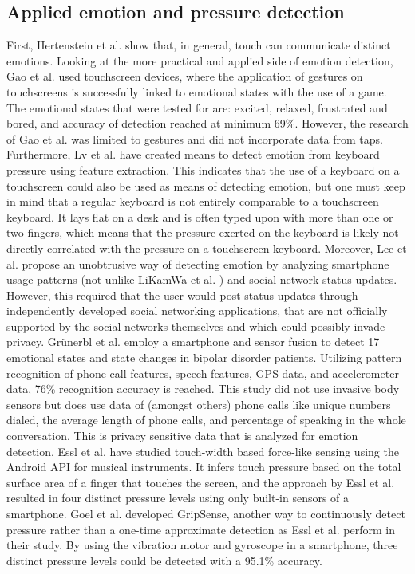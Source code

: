 \documentclass{sigchi}
\begin{document}
\subsection{Applied emotion and pressure detection} %
\label{sub:practical_applications}
First, Hertenstein et al. \cite{Hertenstein2006} show that, in general, touch can communicate distinct emotions. Looking at the more practical and applied side of emotion detection, Gao et al. \cite{Gao2012} used touchscreen devices, where the application of gestures on touchscreens is successfully linked to emotional states with the use of a game. The emotional states that were tested for are: excited, relaxed, frustrated and bored, and accuracy of detection reached at minimum 69\%. However, the research of Gao et al. was limited to gestures and did not incorporate data from taps. Furthermore, Lv et al. \cite{H.R.LvZ.L.LinW.J.Yin2008} have created means to detect emotion from keyboard pressure using feature extraction. This indicates that the use of a keyboard on a touchscreen could also be used as means of detecting emotion, but one must keep in mind that a regular keyboard is not entirely comparable to a touchscreen keyboard. It lays flat on a desk and is often typed upon with more than one or two fingers, which means that the pressure exerted on the keyboard is likely not directly correlated with the pressure on a touchscreen keyboard. Moreover, Lee et al. \cite{Lee2012} propose an unobtrusive way of detecting emotion by analyzing smartphone usage patterns (not unlike LiKamWa et al. \cite{Likamwa2013}) and social network status updates. However, this required that the user would post status updates through independently developed social networking applications, that are not officially supported by the social networks themselves and which could possibly invade privacy. Gr{\"{u}}nerbl et al. \cite{Grunerbl2015} employ a smartphone and sensor fusion to detect 17 emotional states and state changes in bipolar disorder patients. Utilizing pattern recognition of phone call features, speech features, GPS data, and accelerometer data, 76\% recognition accuracy is reached. This study did not use invasive body sensors but does use data of (amongst others) phone calls like unique numbers dialed, the average length of phone calls, and percentage of speaking in the whole conversation. This is privacy sensitive data that is analyzed for emotion detection. Essl et al. \cite{Essl2010} have studied touch-width based force-like sensing using the Android API for musical instruments. It infers touch pressure based on the total surface area of a finger that touches the screen, and the approach by Essl et al. resulted in four distinct pressure levels using only built-in sensors of a smartphone. Goel et al. \cite{Goel2012} developed GripSense, another way to continuously detect pressure rather than a one-time approximate detection as Essl et al. perform in their study. By using the vibration motor and gyroscope in a smartphone, three distinct pressure levels could be detected with a 95.1\% accuracy.
\end{document}
